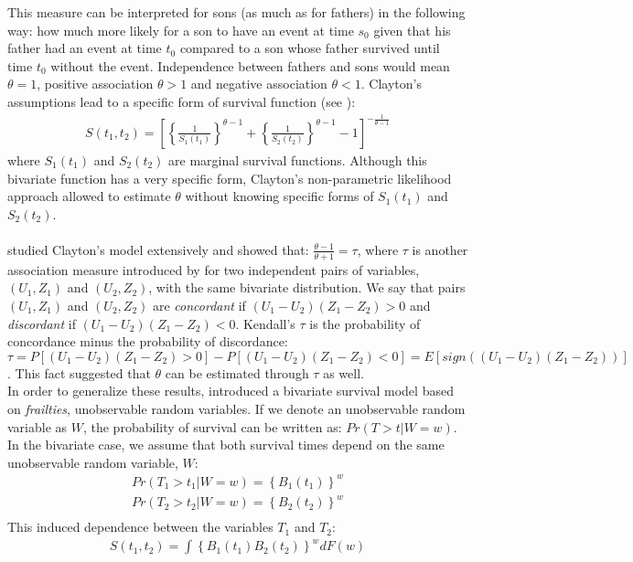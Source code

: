\documentclass[]{article}
\begin{document}
This measure can be interpreted for sons (as much as for fathers) in the following way: how much more likely for a son to have an event at time $s_0$ given that his father had an event at time $t_0$ compared to a son whose father survived until time $t_0$ without the event. Independence between fathers and sons would mean $\theta = 1$, positive association $\theta > 1$ and negative association $\theta < 1$.
Clayton's assumptions lead to a specific form of survival function (see \cite{oakes1989bivariate}):
$$
\begin{aligned}
S(t_1,t_2) = \left[\left\{ \frac{1}{S_1(t_1)} \right\}^{\theta - 1} + \left\{ \frac{1}{S_2(t_2)} \right\}^{\theta - 1}   - 1 \right]^{-\frac{1}{\theta-1}}
\end{aligned}
$$
where $S_1(t_1)$ and $S_2(t_2)$ are marginal survival functions. Although this bivariate function has a very specific form, Clayton's non-parametric likelihood approach allowed to estimate $\theta$ without knowing specific forms of $S_1(t_1)$ and $S_2(t_2)$.\\
~\\
\cite{oakes1982model} studied Clayton's model extensively and showed that: $\frac{\theta - 1}{\theta + 1} = \tau$, where $\tau$ is another association measure introduced by  \cite{kendall1938new} for two independent pairs of variables, $(U_1, Z_1)$ and $(U_2, Z_2)$, with the same bivariate distribution. We say that pairs $(U_1, Z_1)$ and $(U_2, Z_2)$ are \emph{concordant} if $(U_1 - U_2)(Z_1 - Z_2)>0$ and \emph{discordant} if $(U_1 - U_2)(Z_1 - Z_2)<0$. Kendall's $\tau$ is the probability of concordance minus the probability of discordance:
$\tau = P[(U_1 - U_2)(Z_1 - Z_2)>0] - P[(U_1 - U_2)(Z_1 - Z_2)<0] = E[sign((U_1 - U_2)(Z_1 - Z_2))]$. This fact suggested that $\theta$ can be estimated through $\tau$ as well.\\

In order to generalize these results, \cite{oakes1989bivariate} introduced a bivariate survival model based on \emph{frailties}, unobservable random variables. If we denote an unobservable random variable as $W$, the probability of survival can be written as: $Pr(T>t|W=w)$. In the bivariate case, we assume that both survival times depend on the same unobservable random variable, $W$:
$$
\begin{aligned}
	Pr(T_1>t_1|W=w)=\left\{ B_1(t_1) \right\}^w\\
	Pr(T_2>t_2|W=w)=\left\{ B_2(t_2) \right\}^w\\
\end{aligned}
$$
This induced dependence between the variables $T_1$ and $T_2$:
$$
\begin{aligned}
	S(t_1,t_2) = \int \left\{ B_1(t_1) B_2(t_2)\right\}^w dF(w)
\end{aligned}
$$
\end{document}
